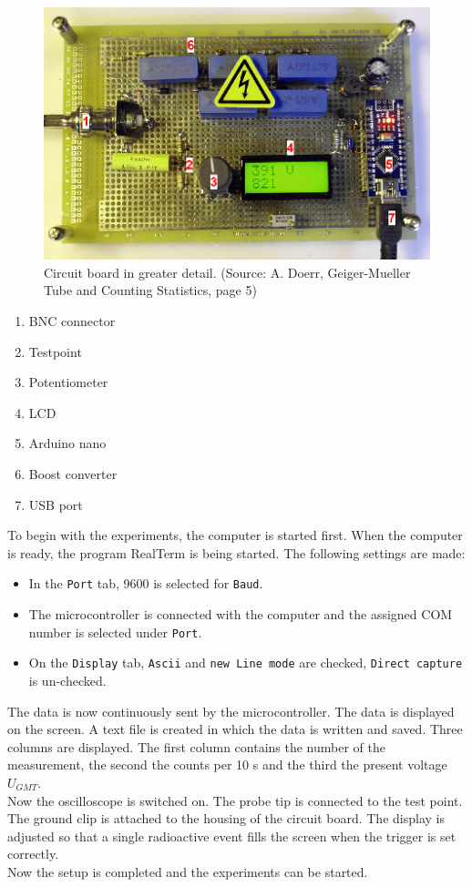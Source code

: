 \begin{figure}[H]
	\begin{center}
		\includegraphics[width=14cm]{circuit_board.png}
		\caption{Circuit board in greater detail. (Source: A. Doerr, Geiger-Mueller Tube and Counting Statistics, page 5)}  
		\label{fig:circuit_board} 
	\end{center}
\end{figure}
%
\begin{enumerate}
	\item BNC connector
	\item Testpoint
	\item Potentiometer
	\item LCD
	\item Arduino nano
	\item Boost converter
	\item USB port
\end{enumerate}
%
To begin with the experiments, the computer is started first. When the computer is ready, the program RealTerm is being started. The following settings are made:
\begin{itemize}
	\item In the \texttt{Port} tab, 9600 is selected for \texttt{Baud}.
	\item The microcontroller is connected with the computer and the assigned COM number is selected under \texttt{Port}.
	\item On the \texttt{Display} tab, \texttt{Ascii} and \texttt{new Line mode} are checked, \texttt{Direct capture} is un-checked.
\end{itemize}
%
The data is now continuously sent by the microcontroller. The data is displayed on the screen. A text file is created in which the data is written and saved. Three columns are displayed. The first column contains the number of the measurement, the second the counts per 10 s and the third the present voltage $U_{GMT}$.\\
Now the oscilloscope is switched on. The probe tip is connected to the test point. The ground clip is attached to the housing of the circuit board. The display is adjusted so that a single radioactive event fills the screen when the trigger is set correctly.\\
Now the setup is completed and the experiments can be started.
